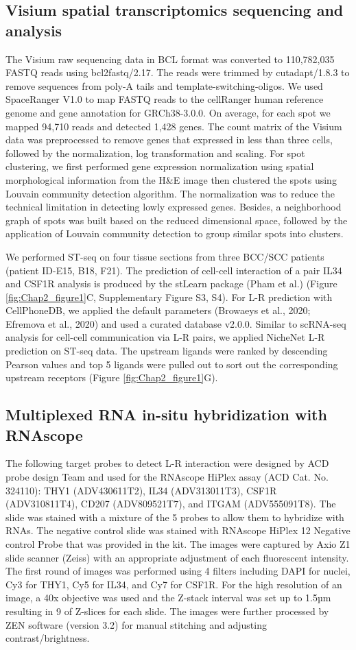 \subsection{Visium spatial transcriptomics sequencing and analysis}
The Visium raw sequencing data in BCL format was converted to 110,782,035 FASTQ reads using bcl2fastq/2.17. The reads were trimmed by cutadapt/1.8.3 to remove sequences from poly-A tails and template-switching-oligos. We used SpaceRanger V1.0 to map FASTQ reads to the cellRanger human reference genome and gene annotation for GRCh38-3.0.0. On average, for each spot we mapped 94,710 reads and detected 1,428 genes. The count matrix of the Visium data was preprocessed to remove genes that expressed in less than three cells, followed by the normalization, log transformation and scaling. For spot clustering, we first performed gene expression normalization using spatial morphological information from the H\&E image then clustered the spots using Louvain community detection algorithm. The normalization was to reduce the technical limitation in detecting lowly expressed genes. Besides, a neighborhood graph of spots was built based on the reduced dimensional space, followed by the application of Louvain community detection to group similar spots into clusters. 

We performed ST-seq on four tissue sections from three BCC/SCC patients (patient ID-E15, B18, F21). The prediction of cell-cell interaction of a pair IL34 and CSF1R analysis is produced by the stLearn package (Pham et al.) (Figure \ref{fig:Chap2_figure1}C, Supplementary Figure S3, S4).  For L-R prediction with CellPhoneDB, we applied the default parameters (Browaeys et al., 2020; Efremova et al., 2020) and used a curated database v2.0.0. Similar to scRNA-seq analysis for cell-cell communication via L-R pairs, we applied NicheNet L-R prediction on ST-seq data. The upstream ligands were ranked by descending Pearson values and top 5 ligands were pulled out to sort out the corresponding upstream receptors (Figure \ref{fig:Chap2_figure1}G). 

\subsection{Multiplexed RNA in-situ hybridization with RNAscope}
The following target probes to detect L-R interaction were designed by ACD probe design Team and used for the RNAscope HiPlex assay (ACD Cat. No. 324110): THY1 (ADV430611T2), IL34 (ADV313011T3), CSF1R (ADV310811T4), CD207 (ADV809521T7), and ITGAM (ADV555091T8). The slide was stained with a mixture of the 5 probes to allow them to hybridize with RNAs. The negative control slide was stained with RNAscope HiPlex 12 Negative control Probe that was provided in the kit. The images were captured by Axio Z1 slide scanner (Zeiss) with an appropriate adjustment of each fluorescent intensity. The first round of images was performed using 4 filters including DAPI for nuclei, Cy3 for THY1, Cy5 for IL34, and Cy7 for CSF1R. For the high resolution of an image, a 40x objective was used and the Z-stack interval was set up to 1.5µm resulting in 9 of Z-slices for each slide. The images were further processed by ZEN software (version 3.2) for manual stitching and adjusting contrast/brightness.

